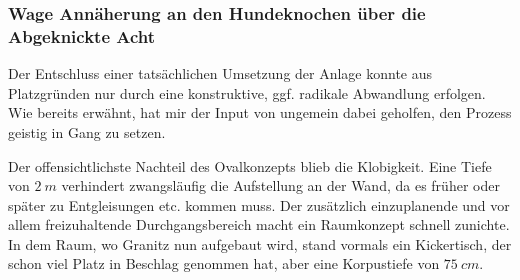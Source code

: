 \subsubsection{Wage Ann\"aherung an den Hundeknochen \"uber die Abgeknickte Acht}
\label{sec:map_development_state2}

Der Entschluss einer tats\"achlichen Umsetzung der Anlage konnte aus Platzgr\"unden nur durch eine konstruktive, ggf. radikale Abwandlung erfolgen.
Wie bereits erw\"ahnt, hat mir der Input von \cite{Gee17} ungemein dabei geholfen, den Prozess geistig in Gang zu setzen.

Der offensichtlichste Nachteil des Ovalkonzepts blieb die Klobigkeit.
Eine Tiefe von $2~m$ verhindert zwangsl\"aufig die Aufstellung an der Wand, da es fr\"uher oder sp\"ater zu Entgleisungen etc. kommen muss.
Der zus\"atzlich einzuplanende und vor allem freizuhaltende Durchgangsbereich macht ein Raumkonzept schnell zunichte.
In dem Raum, wo Granitz nun aufgebaut wird, stand vormals ein Kickertisch, der schon viel Platz in Beschlag genommen hat, aber eine Korpustiefe von $75~cm$.

